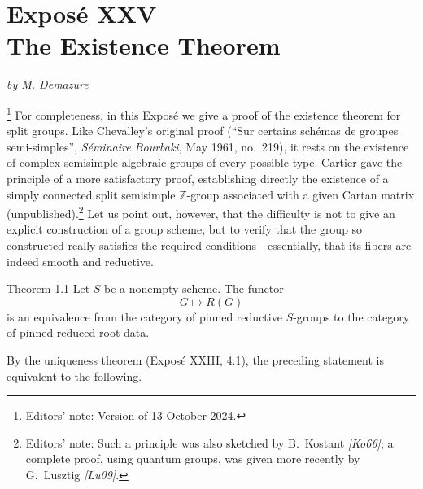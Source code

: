 
\chapter*{Exposé XXV\\The Existence Theorem}
\begin{center}
\textit{by M. Demazure}
\end{center}

\footnote{Editors' note: Version of 13 October 2024.}
For completeness, in this Exposé we give a proof of the existence theorem for split
groups. Like Chevalley's original proof (``Sur certains schémas de groupes
semi-simples'', \textit{Séminaire Bourbaki}, May 1961, no.~219), it rests on the
existence of complex semisimple algebraic groups of every possible type. Cartier
gave the principle of a more satisfactory proof, establishing directly the
existence of a simply connected split semisimple \(\mathbb Z\)-group associated
with a given Cartan matrix (unpublished).\footnote{Editors' note: Such a principle
was also sketched by B.~Kostant \emph{[Ko66]}; a complete proof, using quantum
groups, was given more recently by G.~Lusztig \emph{[Lu09]}.}
Let us point out, however, that the difficulty is not to give an explicit
construction of a group scheme, but to verify that the group so constructed
really satisfies the required conditions---essentially, that its fibers are
indeed smooth and reductive.


\begin{sgastatement}{Theorem 1.1}
Let \(S\) be a nonempty scheme. The functor
\[
  G\longmapsto R(G)
\]
is an equivalence from the category of pinned reductive \(S\)-groups to the
category of pinned reduced root data.
\end{sgastatement}

By the uniqueness theorem (Exposé XXIII, 4.1), the preceding statement is
equivalent to the following.

